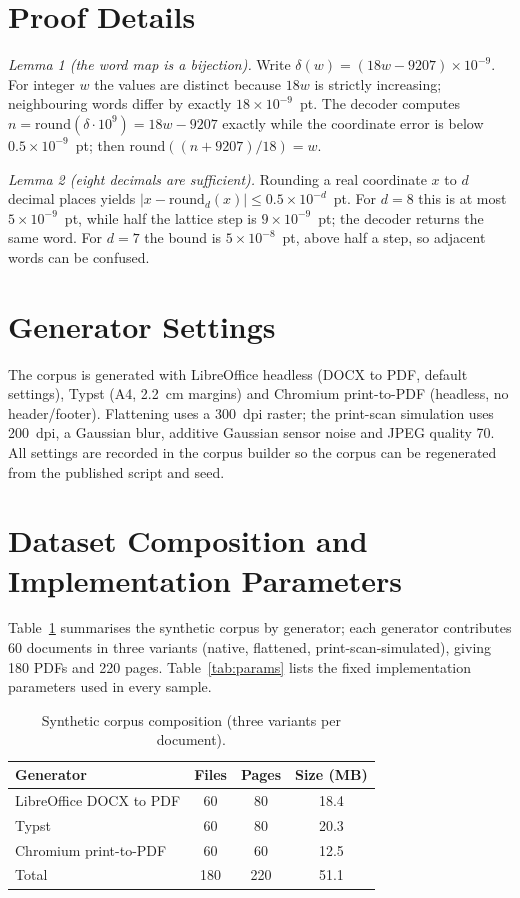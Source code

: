 \documentclass[journal]{IEEEtran}
\begin{document}
\appendices
\section{Proof Details}
\emph{Lemma 1 (the word map is a bijection).} Write $\delta(w)=(18w-9207)\times10^{-9}$. For integer $w$ the values are distinct because $18w$ is strictly increasing; neighbouring words differ by exactly $18\times10^{-9}$~pt. The decoder computes $n=\mathrm{round}(\delta\cdot10^{9})=18w-9207$ exactly while the coordinate error is below $0.5\times10^{-9}$~pt; then $\mathrm{round}((n+9207)/18)=w$.

\emph{Lemma 2 (eight decimals are sufficient).} Rounding a real coordinate $x$ to $d$ decimal places yields $|x-\mathrm{round}_d(x)|\le0.5\times10^{-d}$~pt. For $d=8$ this is at most $5\times10^{-9}$~pt, while half the lattice step is $9\times10^{-9}$~pt; the decoder returns the same word. For $d=7$ the bound is $5\times10^{-8}$~pt, above half a step, so adjacent words can be confused.

\section{Generator Settings}
The corpus is generated with LibreOffice headless (DOCX to PDF, default settings), Typst (A4, 2.2~cm margins) and Chromium print-to-PDF (headless, no header/footer). Flattening uses a 300~dpi raster; the print-scan simulation uses 200~dpi, a Gaussian blur, additive Gaussian sensor noise and JPEG quality 70. All settings are recorded in the corpus builder so the corpus can be regenerated from the published script and seed.



\section{Dataset Composition and Implementation Parameters}
Table~\ref{tab:corpusstats} summarises the synthetic corpus by generator; each generator contributes 60 documents in three variants (native, flattened, print-scan-simulated), giving 180 PDFs and 220 pages. Table~\ref{tab:params} lists the fixed implementation parameters used in every sample.

\begin{table}[t]
\centering
\footnotesize
\caption{Synthetic corpus composition (three variants per document).}
\label{tab:corpusstats}
\begin{tabular}{@{}lccc@{}}
\toprule
Generator & Files & Pages & Size (MB) \\
\midrule
LibreOffice DOCX to PDF & 60 & 80 & 18.4 \\
Typst & 60 & 80 & 20.3 \\
Chromium print-to-PDF & 60 & 60 & 12.5 \\
\midrule
Total & 180 & 220 & 51.1 \\
\bottomrule
\end{tabular}
\end{table}
\end{document}
